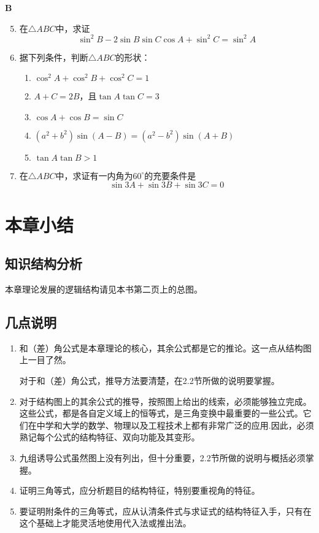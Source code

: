 \begin{center}
    \bfseries B
\end{center}

\begin{enumerate}\setcounter{enumi}{4}
    \item 在$\triangle ABC$中，求证
\[\sin^2B-2\sin B\sin C\cos A+\sin^2 C=\sin^2A\]
\item 据下列条件，判断$\triangle ABC$的形状：
\begin{enumerate}[(1)]
    \item $\cos^2A+\cos^2B+\cos^2C=1$
    \item $A+C=2B$，且$\tan A\tan C=3$
    \item $\cos A+\cos B=\sin C$
    \item $(a^2+b^2)\sin(A-B)=(a^2-b^2)\sin(A+B)$
    \item $\tan A\tan B>1$
\end{enumerate}

\item 在$\triangle ABC$中，求证有一内角为$60^{\circ}$的充要条件是
\[\sin 3A+\sin3B+\sin 3C=0\]
\end{enumerate}

\section{本章小结}
\subsection{知识结构分析}

本章理论发展的逻辑结构请见本书第二页上的总图。

\subsection{几点说明}
\begin{enumerate}
\item 和（差）角公式是本章理论的核心，其余公式都是它的推论。这一点从结构图上一目了然。

对于和（差）角公式，推导方法要清楚，在2.2节所做的说明要掌握。
\item 对于结构图上的其余公式的推导，按照图上给出的线索，必须能够独立完成。这些公式，都是各自定义域上的恒等式，是三角变换中最重要的一些公式。它们在中学和大学的数学、物理以及工程技术上都有非常广泛的应用.因此，必须熟记每个公式的结构特征、双向功能及其变形。
\item 九组诱导公式虽然图上没有列出，但十分重要，2.2节所做的说明与概括必须掌握。
\item  证明三角等式，应分析题目的结构特征，特别要重视角的特征。
\item 要证明附条件的三角等式，应从认清条件式与求证式的结构特征入手，只有在这个基础上才能灵活地使用代入法或推出法。
\end{enumerate}


